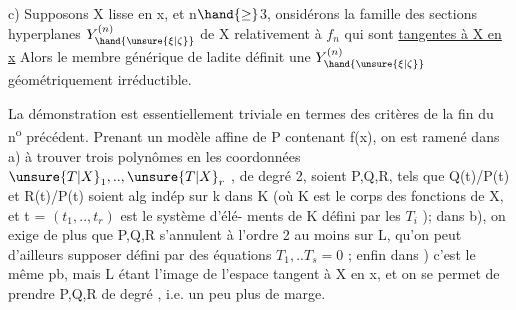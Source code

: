 c) Supposons X lisse en x,  et  n$\hand{\geq}$3,   onsidérons
la famille des sections hyperplanes   $Y^{(n)}_{\hand{\unsure{\xi|\zeta}}}$ de X relativement
à $f_n$ qui sont \uline{tangentes à X en x} Alors le membre générique de ladite
définit une $Y^{(n)}_{\hand{\unsure{\xi|\zeta}}}$ géométriquement irréductible.

La démonstration est essentiellement triviale en termes des
critères de la fin du n\textsuperscript{o} précédent. Prenant un modèle affine de P
contenant f(x), on est ramené dans a) à trouver  trois polynômes
en les coordonnées $\unsure{T|X}_1,..,\unsure{T|X}_r$ , de degré 2, soient P,Q,R, tels que
Q(t)/P(t) et R(t)/P(t) soient alg indép sur k dans K (où K est le
corps des fonctions de X, et t = $(t_1,..,t_r)$ est le système d'élé-%
ments de K défini par les $T_i$ ); dans b), on exige de plus que P,Q,R
s'annulent à l'ordre 2 au moins sur L, qu'on peut d'ailleurs supposer
défini par des équations $T_1,..T_s = 0$ ; enfin dans ) c'est le même
pb, mais L étant l'image de l'espace tangent à X en x, et on se permet
 de prendre P,Q,R  de degré  , i.e. un peu plus de marge.

